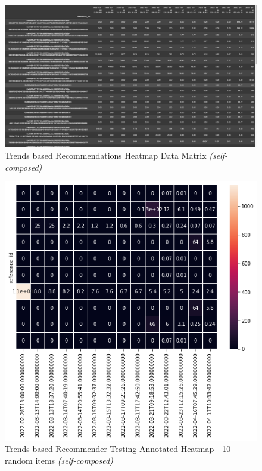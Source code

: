 \documentclass[manuscript,natbib=false, anonymous]{acmart}
\begin{document}
\begin{figure}[h]
\centering
\includegraphics[width=\linewidth]{images/heatmap-data.png}
\caption{Trends based Recommendations Heatmap Data Matrix \textit{(self-composed)}}
\label{fig:trends-recsys-heatmap-data-matrix}
\end{figure}


\begin{figure}[h]
\centering
\includegraphics[width=0.6\linewidth]{images/trends-heatmap-10-rand-annot.png}
\caption{Trends based Recommender Testing Annotated Heatmap - 10 random items \textit{(self-composed)}}
\label{fig:trends-recsys-heatmap-10-anot}
\end{figure}
\end{document}
